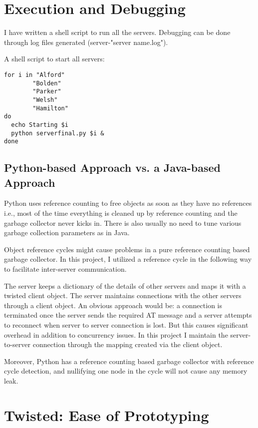 \documentclass[letterpaper,twocolumn,10pt]{article}
\begin{document}
\section{Execution and Debugging}
\label{DebuggingSection}
I have written a shell script to run all the servers. Debugging can be done through log files generated (server-"server name.log").

A shell script to start all servers:
\begin{lstlisting}
for i in "Alford" 
		"Bolden" 
		"Parker" 
		"Welsh" 
		"Hamilton"
do
  echo Starting $i
  python serverfinal.py $i &
done
\end{lstlisting}



\subsection{Python-based Approach vs. a Java-based Approach}

Python uses reference counting to free objects as soon as they have no references i.e., most of the time everything is cleaned up by reference counting and the garbage collector never kicks in. There is also usually no need to tune various garbage collection parameters as in Java.

Object reference cycles might cause problems in a pure reference counting based garbage collector. In this project, I utilized a reference cycle in the following way to facilitate inter-server communication.

The server keeps a dictionary of the details of other servers and maps it with a twisted client object. The server maintains connections with the other servers through a client object. An obvious approach would be: a connection is terminated once the server sends the required AT message and a server attempts to reconnect when server to server connection is lost. But this causes significant overhead in addition to concurrency issues. In this project I maintain the server-to-server connection through the mapping created via the client object.

Moreover, Python has a reference counting based garbage collector with reference cycle detection, and nullifying one node in the cycle will not cause any memory leak.


\section{Twisted: Ease of Prototyping}
\end{document}
